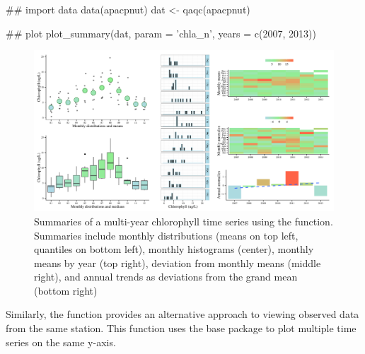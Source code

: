 \begin{example}
## import data
data(apacpnut)
dat <- qaqc(apacpnut)

## plot
plot_summary(dat, param = 'chla_n', years = c(2007, 2013))
\end{example}
\begin{figure}[!h]

{\centering \includegraphics[width=\textwidth]{summary_ex-1} 

}

\caption[Summaries of a multi-year chlorophyll time series using the  function]{Summaries of a multi-year chlorophyll time series using the  function.  Summaries include monthly distributions (means on top left, quantiles on bottom left), monthly histograms (center), monthly means by year (top right), deviation from monthly means (middle right), and annual trends as deviations from the grand mean (bottom right)}\label{fig:summary_ex}
\end{figure}

Similarly, the  function provides an alternative approach to viewing observed data from the same station.  This function uses the base  package to plot multiple time series on the same y-axis.

